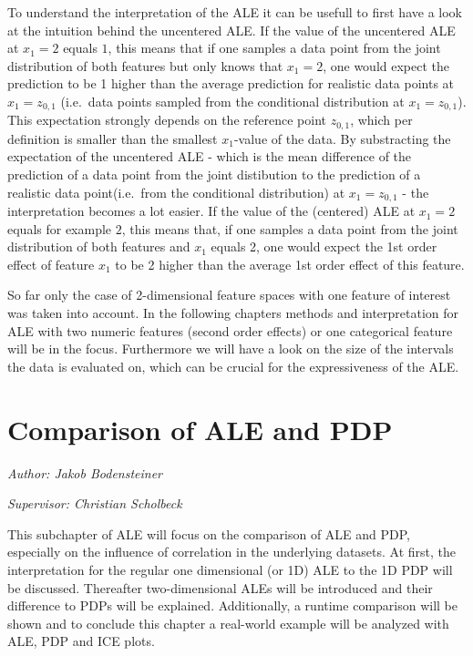 \documentclass[]{krantz}
\begin{document}
To understand the interpretation of the ALE it can be usefull to first
have a look at the intuition behind the uncentered ALE. If the value of
the uncentered ALE at \(x_1 = 2\) equals \(1\), this means that if one
samples a data point from the joint distribution of both features but
only knows that \(x_1 = 2\), one would expect the prediction to be 1
higher than the average prediction for realistic data points at
\(x_1 = z_{0,1}\) (i.e.~data points sampled from the conditional
distribution at \(x_1 = z_{0,1}\)). This expectation strongly depends on
the reference point \(z_{0,1}\), which per definition is smaller than
the smallest \(x_1\)-value of the data. By substracting the expectation
of the uncentered ALE - which is the mean difference of the prediction
of a data point from the joint distibution to the prediction of a
realistic data point(i.e.~from the conditional distribution) at
\(x_1 = z_{0,1}\) - the interpretation becomes a lot easier. If the
value of the (centered) ALE at \(x_1 = 2\) equals for example \(2\),
this means that, if one samples a data point from the joint distribution
of both features and \(x_1\) equals 2, one would expect the 1st order
effect of feature \(x_1\) to be 2 higher than the average 1st order
effect of this feature.

So far only the case of 2-dimensional feature spaces with one feature of
interest was taken into account. In the following chapters methods and
interpretation for ALE with two numeric features (second order effects)
or one categorical feature will be in the focus. Furthermore we will
have a look on the size of the intervals the data is evaluated on, which
can be crucial for the expressiveness of the ALE.

\chapter{Comparison of ALE and PDP}\label{ale-pdp}

\emph{Author: Jakob Bodensteiner}

\emph{Supervisor: Christian Scholbeck}

This subchapter of ALE will focus on the comparison of ALE and PDP,
especially on the influence of correlation in the underlying datasets.
At first, the interpretation for the regular one dimensional (or 1D) ALE
to the 1D PDP will be discussed. Thereafter two-dimensional ALEs will be
introduced and their difference to PDPs will be explained. Additionally,
a runtime comparison will be shown and to conclude this chapter a
real-world example will be analyzed with ALE, PDP and ICE plots.
\end{document}
